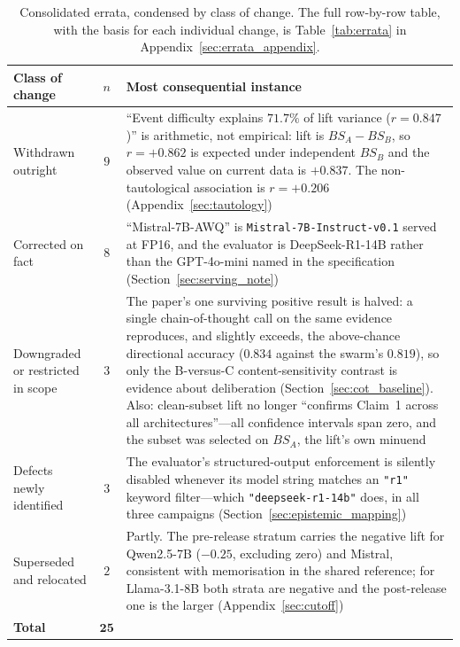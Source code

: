 \documentclass[11pt,journal,onecolumn]{IEEEtran}
\begin{document}
\begin{table}[!htbp]
\centering
\caption{Consolidated errata, condensed by class of change. The full row-by-row table, with the basis for each individual change, is Table~\ref{tab:errata} in Appendix~\ref{sec:errata_appendix}.}
\label{tab:errata_summary}
\small
\begin{tabular}{>{\raggedright\arraybackslash}p{3.5cm}c>{\raggedright\arraybackslash}p{10.4cm}}
\toprule
\textbf{Class of change} & \textbf{$n$} & \textbf{Most consequential instance} \\
\midrule
Withdrawn outright & $9$ &
``Event difficulty explains $71.7\%$ of lift variance ($r = 0.847$)'' is arithmetic, not empirical: lift is $BS_A - BS_B$, so $r = +0.862$ is expected under independent $BS_B$ and the observed value on current data is $+0.837$. The non-tautological association is $r = +0.206$ (Appendix~\ref{sec:tautology}) \\
\addlinespace
Corrected on fact & $8$ &
``Mistral-7B-AWQ'' is \texttt{Mistral-7B-Instruct-v0.1} served at FP16, and the evaluator is DeepSeek-R1-14B rather than the GPT-4o-mini named in the specification (Section~\ref{sec:serving_note}) \\
\addlinespace
Downgraded or restricted in scope & $3$ &
The paper's one surviving positive result is halved: a single chain-of-thought call on the same evidence reproduces, and slightly exceeds, the above-chance directional accuracy ($0.834$ against the swarm's $0.819$), so only the B-versus-C content-sensitivity contrast is evidence about deliberation (Section~\ref{sec:cot_baseline}). Also: clean-subset lift no longer ``confirms Claim~1 across all architectures''---all confidence intervals span zero, and the subset was selected on $BS_A$, the lift's own minuend \\
\addlinespace
Defects newly identified & $3$ &
The evaluator's structured-output enforcement is silently disabled whenever its model string matches an \texttt{"r1"} keyword filter---which \texttt{"deepseek-r1-14b"} does, in all three campaigns (Section~\ref{sec:epistemic_mapping}) \\
\addlinespace
Superseded and relocated & $2$ &
Partly. The pre-release stratum carries the negative lift for Qwen2.5-7B ($-0.25$, excluding zero) and Mistral, consistent with memorisation in the shared reference; for Llama-3.1-8B both strata are negative and the post-release one is the larger (Appendix~\ref{sec:cutoff}) \\
\midrule
\textbf{Total} & $\mathbf{25}$ & \\
\bottomrule
\end{tabular}
\setlength{\tabcolsep}{6pt}
\end{table}
\end{document}
